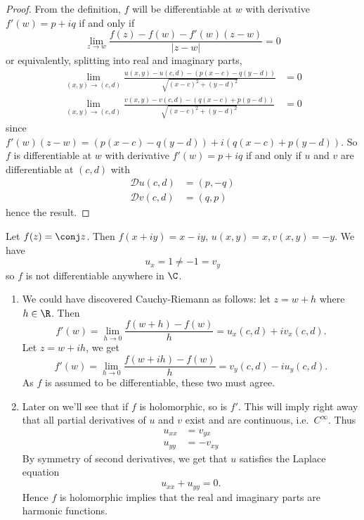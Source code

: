 \documentclass[a4paper]{article}
\newcommand*{\D}{\mathcal{D}}
\begin{document}
\begin{proof}
  From the definition, \(f\) will be differentiable at \(w\) with derivative \(f'(w) = p + iq\) if and only if
  \[
    \lim_{z \to w} \frac{f(z) - f(w) - f'(w)(z - w)}{|z - w|} = 0
  \]
  or equivalently, splitting into real and imaginary parts,
  \begin{align*}
    \lim_{(x, y) \to (c, d)} \frac{u(x, y) - u(c, d) - (p(x - c) - q(y - d))}{\sqrt{(x - c)^2 + (y - d)^2}} &= 0 \\
    \lim_{(x, y) \to (c, d)} \frac{v(x, y) - v(c, d) - (q(x - c) + p(y - d))}{\sqrt{(x - c)^2 + (y - d)^2}} &= 0
  \end{align*}
  since \(f'(w)(z - w) = (p(x - c) - q(y - d)) + i(q(x - c) + p(y - d))\). So \(f\) is differentiable at \(w\) with derivative \(f'(w) = p + iq\) if and only if \(u\) and \(v\) are differentiable at \((c, d)\) with
  \begin{align*}
    \D u(c, d) &= (p, -q) \\
    \D v(c, d) &= (q, p)
  \end{align*}
  hence the result.
\end{proof}

\begin{eg}
  Let \(f(z) = \conj z\). Then \(f(x + iy) = x - iy\), \(u(x, y) = x, v(x, y) = -y\). We have
  \[
    u_x = 1 \neq -1 = v_y
  \]
  so \(f\) is not differentiable anywhere in \(\C\).
\end{eg}

\begin{remark}\leavevmode
  \begin{enumerate}
  \item We could have discovered Cauchy-Riemann as follows: let \(z = w + h\) where \(h \in \R\). Then
    \[
      f'(w) = \lim_{h \to 0} \frac{f(w + h) - f(w)}{h} = u_x(c, d) + iv_x(c, d).
    \]
    Let \(z = w + ih\), we get
    \[
      f'(w) = \lim_{h \to 0} \frac{f(w + ih) - f(w)}{h} = v_y(c, d) - iu_y(c, d).
    \]
    As \(f\) is assumed to be differentiable, these two must agree.
  \item Later on we'll see that if \(f\) is holomorphic, so is \(f'\). This will imply right away that all partial derivatives of \(u\) and \(v\) exist and are continuous, i.e.\ \(C^\infty\). Thus
    \begin{align*}
      u_{xx} &= v_{yx} \\
      u_{yy} &= -v_{xy}
    \end{align*}
    By symmetry of second derivatives, we get that \(u\) satisfies the Laplace equation
    \[
      u_{xx} + u_{yy} = 0.
    \]
    Hence \(f\) is holomorphic implies that the real and imaginary parts are harmonic functions.
  \end{enumerate}
\end{remark}
\end{document}
